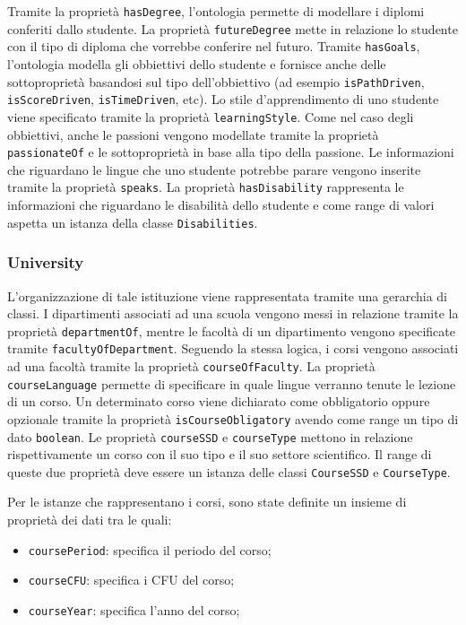 Tramite la proprietà \texttt{hasDegree}, l'ontologia permette di modellare i diplomi conferiti dallo studente. La proprietà \texttt{futureDegree} mette in relazione lo studente con il tipo di diploma che vorrebbe conferire nel futuro. Tramite \texttt{hasGoals}, l'ontologia modella gli obbiettivi dello studente e fornisce anche delle sottoproprietà basandosi sul tipo dell'obbiettivo (ad esempio \texttt{isPathDriven}, \texttt{isScoreDriven}, \texttt{isTimeDriven}, etc). Lo stile d'apprendimento di uno studente viene specificato tramite la proprietà \texttt{learningStyle}. Come nel caso degli obbiettivi, anche le passioni vengono modellate tramite la proprietà \texttt{passionateOf} e le sottoproprietà in base alla tipo della passione. Le informazioni che riguardano le lingue che uno studente potrebbe parare vengono inserite tramite la proprietà \texttt{speaks}.
La proprietà \texttt{hasDisability} rappresenta le informazioni che riguardano le disabilità dello studente e come range di valori aspetta un istanza della classe \texttt{Disabilities}.

\subsubsection{University}
L'organizzazione di tale istituzione viene rappresentata tramite una gerarchia di classi. I dipartimenti associati ad una scuola vengono messi in relazione tramite la proprietà \texttt{departmentOf}, mentre le facoltà di un dipartimento vengono specificate tramite \texttt{facultyOfDepartment}. Seguendo la stessa logica, i corsi vengono associati ad una facoltà tramite la proprietà \texttt{courseOfFaculty}. La proprietà \texttt{courseLanguage} permette di specificare in quale lingue verranno tenute le lezione di un corso. Un determinato corso viene dichiarato come obbligatorio oppure opzionale tramite la proprietà \texttt{isCourseObligatory} avendo come range un tipo di dato \texttt{boolean}. Le proprietà \texttt{courseSSD} e \texttt{courseType} mettono in relazione rispettivamente un corso con il suo tipo e il suo settore scientifico. Il range di queste due proprietà deve essere un istanza delle classi \texttt{CourseSSD} e \texttt{CourseType}. 

Per le istanze che rappresentano i corsi, sono state definite un insieme di proprietà dei dati tra le quali:
\begin{itemize}
    \item \texttt{coursePeriod}: specifica il periodo del corso;
    \item \texttt{courseCFU}: specifica i CFU del corso;
    \item \texttt{courseYear}: specifica l'anno del corso;
\end{itemize}

